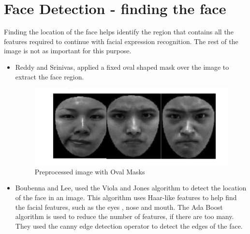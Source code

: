 \section{Face Detection - finding the face  }

Finding the location of the face helps identify the region that contains all the features required to continue with facial expression recognition. The rest of the image is not as important for this purpose.
\begin{itemize}
\item Reddy and Srinivas, applied a fixed oval shaped mask over the image to extract the face region\cite{12}.

\begin{figure}[ht]
  \centering
  \includegraphics[scale=0.4]{6}
  \caption{Preprocessed image with Oval Masks}
\end{figure}

\item Boubenna and Lee, used the Viola and Jones algorithm to detect the location of the face in an image. \cite{viola}This algorithm uses Haar-like features to help find the facial features, such as the eyes , nose and mouth. The Ada Boost algorithm is used to reduce the number of features, if there are too many. They used the canny edge detection operator to detect the edges of the face.\cite{3}
\end{itemize}


